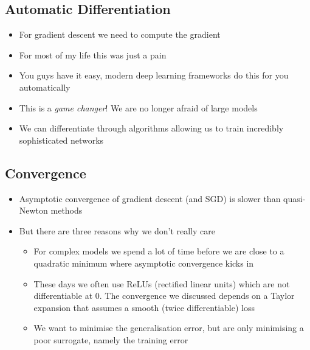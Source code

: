 
\begin{slide}
  \section{Automatic Differentiation}

\begin{PauseHighLight}
  \begin{itemize}
  \item For gradient descent we need to compute the gradient\pause
  \item For most of my life this was just a pain\pause
  \item You guys have it easy, modern deep learning frameworks do this
    for you automatically\pause
  \item This is a \textit{game changer}!\pause{}  We are no longer afraid of
    large models\pause
  \item We can differentiate through algorithms allowing us to
    train incredibly sophisticated networks\pause
  \end{itemize}
\end{PauseHighLight}


\end{slide}


\begin{slide}
\section{Convergence}

\begin{PauseHighLight}
  \begin{itemize}
  \item Asymptotic convergence of gradient descent (and SGD) is slower
    than quasi-Newton methods\pause
  \item But there are three reasons why we don't really care\pause
    \begin{itemize}
    \item For complex models we spend a lot of time before we are
      close to a quadratic minimum where asymptotic convergence kicks in\pause
    \item These days we often use ReLUs (rectified linear units) which are not differentiable at 0.  The convergence we discussed depends on a
      Taylor expansion that assumes a smooth (twice differentiable) loss\pause
    \item We want to minimise the generalisation error, but are only
      minimising a poor surrogate, namely the training error\pause
    \end{itemize}
        
  \end{itemize}
\end{PauseHighLight}

\end{slide}



